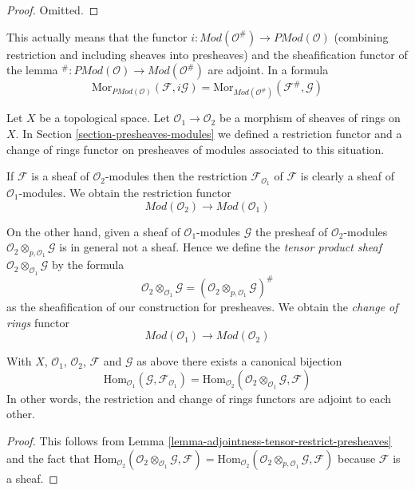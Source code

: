 \begin{proof}
Omitted.
\end{proof}

\noindent
This actually means that the functor
$i : \textit{Mod}(\mathcal{O}^\#) \to \textit{PMod}(\mathcal{O})$
(combining restriction and including sheaves into presheaves)
and the sheafification functor of the lemma
${}^\# : \textit{PMod}(\mathcal{O}) \to \textit{Mod}(\mathcal{O}^\#)$
are adjoint. In a formula
$$
\text{Mor}_{\textit{PMod}(\mathcal{O})}(\mathcal{F}, i\mathcal{G})
=
\text{Mor}_{\textit{Mod}(\mathcal{O}^\#)}(\mathcal{F}^\#, \mathcal{G})
$$

\medskip\noindent
Let $X$ be a topological space.
Let $\mathcal{O}_1 \to \mathcal{O}_2$ be
a morphism of sheaves of rings on $X$.
In Section \ref{section-presheaves-modules}
we defined a restriction functor
and a change of rings functor on presheaves of modules
associated to this situation.

\medskip\noindent
If $\mathcal{F}$ is a sheaf of $\mathcal{O}_2$-modules
then the restriction $\mathcal{F}_{\mathcal{O}_1}$
of $\mathcal{F}$ is clearly a sheaf
of $\mathcal{O}_1$-modules. We obtain the restriction functor
$$
\textit{Mod}(\mathcal{O}_2)
\longrightarrow
\textit{Mod}(\mathcal{O}_1)
$$

\medskip\noindent
On the other hand, given a sheaf of $\mathcal{O}_1$-modules
$\mathcal{G}$ the presheaf of $\mathcal{O}_2$-modules
$\mathcal{O}_2 \otimes_{p, \mathcal{O}_1} \mathcal{G}$
is in general not a sheaf. Hence we define the
{\it tensor product sheaf}
$\mathcal{O}_2 \otimes_{\mathcal{O}_1} \mathcal{G}$
by the formula
$$
\mathcal{O}_2 \otimes_{\mathcal{O}_1} \mathcal{G}
=
(\mathcal{O}_2 \otimes_{p, \mathcal{O}_1} \mathcal{G})^\#
$$
as the sheafification of our construction for presheaves.
We obtain the {\it change of rings} functor
$$
\textit{Mod}(\mathcal{O}_1)
\longrightarrow
\textit{Mod}(\mathcal{O}_2)
$$

\begin{lemma}
\label{lemma-adjointness-tensor-restrict}
With $X$, $\mathcal{O}_1$, $\mathcal{O}_2$, $\mathcal{F}$ and
$\mathcal{G}$ as above there exists a canonical bijection
$$
\text{Hom}_{\mathcal{O}_1}(\mathcal{G}, \mathcal{F}_{\mathcal{O}_1})
=
\text{Hom}_{\mathcal{O}_2}(
\mathcal{O}_2 \otimes_{\mathcal{O}_1} \mathcal{G},
\mathcal{F}
)
$$
In other words, the restriction and change of rings functors
are adjoint to each other.
\end{lemma}

\begin{proof}
This follows from
Lemma \ref{lemma-adjointness-tensor-restrict-presheaves}
and the fact that
$\text{Hom}_{\mathcal{O}_2}(
\mathcal{O}_2 \otimes_{\mathcal{O}_1} \mathcal{G},
\mathcal{F}
)
=
\text{Hom}_{\mathcal{O}_2}(
\mathcal{O}_2 \otimes_{p, \mathcal{O}_1} \mathcal{G},
\mathcal{F}
)$
because $\mathcal{F}$ is a sheaf.
\end{proof}

